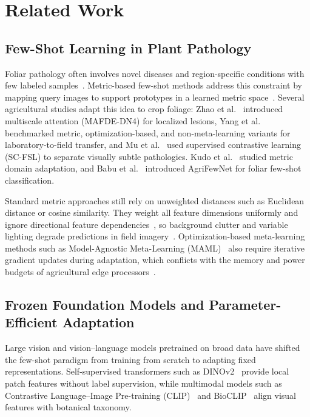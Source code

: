 \section{Related Work}
\label{sec:related_work}

\subsection{Few-Shot Learning in Plant Pathology}
Foliar pathology often involves novel diseases and region-specific conditions with few labeled samples~\cite{shoaib2023advanced,sun2024few}. Metric-based few-shot methods address this constraint by mapping query images to support prototypes in a learned metric space~\cite{snell2017prototypical}. Several agricultural studies adapt this idea to crop foliage: Zhao et al.~\cite{zhao2024mafde} introduced multiscale attention (MAFDE-DN4) for localized lesions, Yang et al.~\cite{yang2024laboratory} benchmarked metric, optimization-based, and non-meta-learning variants for laboratory-to-field transfer, and Mu et al.~\cite{mu2024few} used supervised contrastive learning (SC-FSL) to separate visually subtle pathologies. Kudo et al.~\cite{kudo2024few} studied metric domain adaptation, and Babu et al.~\cite{babu2025agrifewnet} introduced AgriFewNet for foliar few-shot classification.

Standard metric approaches still rely on unweighted distances such as Euclidean distance or cosine similarity. They weight all feature dimensions uniformly and ignore directional feature dependencies~\cite{bateni2020improved}, so background clutter and variable lighting degrade predictions in field imagery~\cite{yang2024laboratory}. Optimization-based meta-learning methods such as Model-Agnostic Meta-Learning (MAML)~\cite{finn2017maml} also require iterative gradient updates during adaptation, which conflicts with the memory and power budgets of agricultural edge processors~\cite{radocaj2025evolution}.

\subsection{Frozen Foundation Models and Parameter-Efficient Adaptation}
Large vision and vision--language models pretrained on broad data have shifted the few-shot paradigm from training from scratch to adapting fixed representations. Self-supervised transformers such as DINOv2~\cite{oquab2023dinov2} provide local patch features without label supervision, while multimodal models such as Contrastive Language--Image Pre-training (CLIP)~\cite{radford2021clip} and BioCLIP~\cite{stevens2024bioclip} align visual features with botanical taxonomy.

